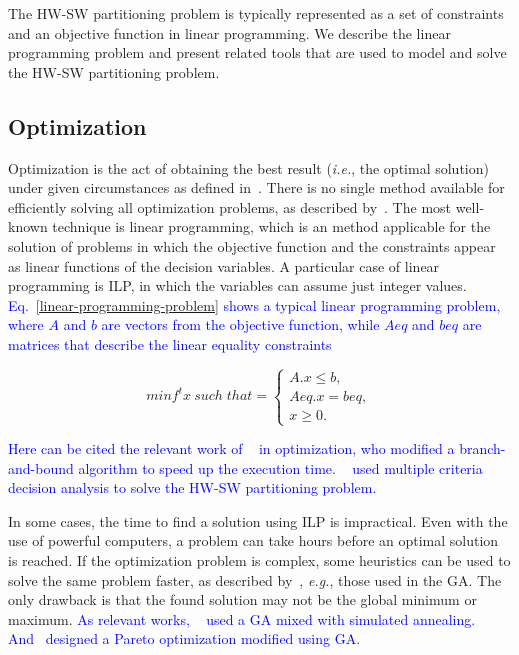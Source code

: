\documentclass{doublecol-new}
\theoremstyle{TH}{
\newtheorem{lemma}{Lemma}
\newtheorem{theorem}[lemma]{Theorem}
\newtheorem{corrolary}[lemma]{Corrolary}
\newtheorem{conjecture}[lemma]{Conjecture}
\newtheorem{proposition}[lemma]{Proposition}
\newtheorem{claim}[lemma]{Claim}
\newtheorem{stheorem}[lemma]{Wrong Theorem}
\newtheorem{algorithm}{Algorithm}
}
\theoremstyle{THrm}{
\newtheorem{definition}{Definition}[section]
\newtheorem{question}{Question}[section]
\newtheorem{remark}{Remark}
\newtheorem{scheme}{Scheme}
}
\theoremstyle{THhit}{
\newtheorem{case}{Case}[section]
}
\begin{document}
The HW-SW partitioning problem is typically represented as a set of constraints and an objective function in linear programming. We describe the linear programming problem and present related tools that are used to model and solve the HW-SW partitioning problem.

\subsection{Optimization}
\label{Optimization}

Optimization is the act of obtaining the best result ({\it i.e.}, the optimal solution) under given circumstances as defined in~\cite{Rao2009}. There is no single method available for efficiently solving all optimization problems, as described by~\cite{Rao2009}. The most well-known technique is linear programming, which is an method applicable for the solution of problems in which the objective function and the constraints appear as linear functions of the decision variables. A particular case of linear programming is ILP, in which the variables can assume just integer values. \textcolor{blue}{Eq.~\eqref{linear-programming-problem} shows a typical linear programming problem, where $A$ and $b$ are vectors from the objective function, while $Aeq$ and $beq$ are matrices that describe the linear equality constraints}

\vspace{2 mm}
\begin{equation}
\label{linear-programming-problem}
  minf^t x \: such \; that  = 
  \begin{cases}
    A.x \leq b, \\ 
    Aeq.x = beq, \\ 
    x \geq 0.
  \end{cases}
\end{equation}

\vspace{2 mm}
\textcolor{blue}{Here can be cited the relevant work of ~\cite{Mann2007} in optimization, who modified a branch-and-bound algorithm to speed up the execution time. ~\cite{Sapienza2013} used multiple criteria decision analysis to solve the HW-SW partitioning problem.}

In some cases, the time to find a solution using ILP is impractical. Even with the use of powerful computers, a problem can take hours before an optimal solution is reached. If the optimization problem is complex, some heuristics can be used to solve the same problem faster, as described by~\cite{Rao2009}, {\it e.g.}, those used in the GA. The only drawback is that the found solution may not be the global minimum or maximum. \textcolor{blue}{As relevant works, ~\cite{Jiang2012} used a GA mixed with simulated annealing. And~\cite{Huong2012} designed a Pareto optimization modified using GA.}
\end{document}
